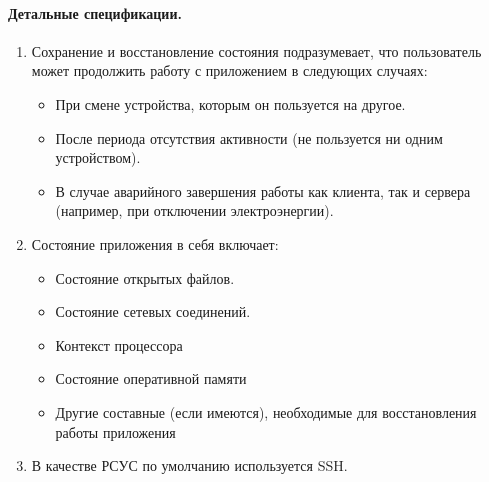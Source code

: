 \paragraph{Детальные спецификации.}
\begin{enumerate}[label={\bfseries ДС-\arabic*}]
   \item Сохранение и восстановление состояния подразумевает, что пользователь может продолжить работу с приложением в следующих случаях:
         \begin{itemize}
            \item При смене устройства, которым он пользуется на другое.
            \item После периода отсутствия активности (не пользуется ни одним устройством).
            \item В случае аварийного завершения работы как клиента, так и сервера (например, при отключении электроэнергии).
         \end{itemize}
         \label{DS-appstate_switch}
   \item Состояние приложения в себя включает:
         \begin{itemize}
            \item Состояние открытых файлов.
            \item Состояние сетевых соединений.
            \item Контекст процессора
            \item Состояние оперативной памяти
            \item Другие составные (если имеются), необходимые для восстановления работы приложения
         \end{itemize}
   \item В качестве РСУС по умолчанию используется SSH. \label{DS-remote_access_default}
\end{enumerate}



